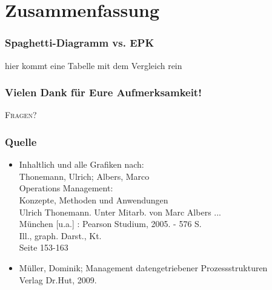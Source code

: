 \documentclass{beamer}
\begin{document}
\section[Zusammenfassung]{Zusammenfassung}
 \begin{frame}
  \frametitle{Spaghetti-Diagramm vs. EPK}
  hier kommt eine Tabelle mit dem Vergleich rein
  
  \end{frame}
  
  
   \begin{frame}
  \frametitle{Vielen Dank für Eure Aufmerksamkeit!}
\begin{center}
  \begin{Huge}
\textsc{Fragen?}
\end{Huge}
  
\end{center}
  \end{frame}
    

 \begin{frame}
  \frametitle{Quelle}
   \begin{itemize}
    \item Inhaltlich und alle Grafiken nach:\\
      Thonemann, Ulrich; Albers, Marco\\
      Operations Management:\\
      Konzepte, Methoden und Anwendungen\\
      Ulrich Thonemann. Unter Mitarb. von Marc Albers ... \\
      München [u.a.] : Pearson Studium, 2005. - 576 S.\\
      Ill., graph. Darst., Kt.\\
      Seite 153-163
     \item Müller, Dominik; Management datengetriebener Prozessstrukturen\\
      Verlag Dr.Hut, 2009.
   \end{itemize}
 \end{frame}
\end{document}
